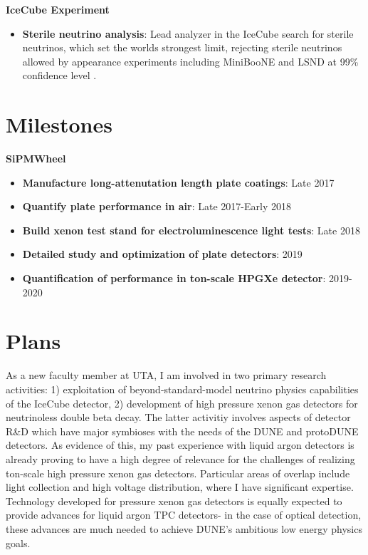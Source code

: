 \noindent\textbf{IceCube Experiment}
\begin{itemize}[noitemsep,nolistsep]
\item{\textbf{Sterile neutrino analysis}}: Lead analyzer in the IceCube search for sterile neutrinos, which  set the worlds strongest limit, rejecting sterile neutrinos allowed by appearance experiments including MiniBooNE and LSND at 99\% confidence level \cite{TheIceCube:2016oqi}.
\end{itemize}



\section*{\textbf{Milestones}}
\noindent\textbf{SiPMWheel}
\begin{itemize}[noitemsep,nolistsep]
\item{\textbf{Manufacture long-attenutation length plate coatings}}: Late 2017
\item{\textbf{Quantify plate performance in air}}: Late 2017-Early 2018
\item{\textbf{Build xenon test stand for electroluminescence light tests}}: Late 2018
\item{\textbf{Detailed study and optimization of plate detectors}}: 2019
\item{\textbf{Quantification of performance in ton-scale HPGXe detector}}: 2019-2020

\end{itemize}

\section*{\textbf{Plans}}
As a new faculty member at UTA, I am involved in two primary research activities: 1) exploitation of beyond-standard-model neutrino physics capabilities of the IceCube detector, 2) development of high pressure xenon gas detectors for neutrinoless double beta decay.  The latter activitiy involves aspects of detector R\&D which have major symbioses with the needs of the DUNE and protoDUNE detectors.  As evidence of this, my past experience with liquid argon detectors is already proving to have a high degree of relevance for the challenges of realizing ton-scale high pressure xenon gas detectors.  Particular areas of overlap include light collection and high voltage distribution, where I have significant expertise.  Technology developed for pressure xenon gas detectors is equally expected to provide advances for liquid argon TPC detectors-  in the case of optical detection, these advances are much needed to achieve DUNE's ambitious low energy physics goals.  

